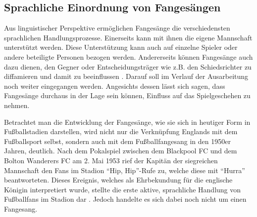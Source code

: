 \subsection{Sprachliche Einordnung von Fangesängen}
Aus linguistischer Perspektive ermöglichen Fangesänge die verschiedensten sprachlichen Handlungsprozesse.
Einerseits kann mit ihnen die eigene Mannschaft unterstützt werden.
Diese Unterstützung kann auch auf einzelne Spieler oder andere beteiligte Personen bezogen werden.
Andererseits können Fangesänge auch dazu dienen, den Gegner oder Entscheidungsträger wie z.B. den Schiedsrichter zu diffamieren und damit zu beeinflussen \cite[S. 167]{RK98}.
Darauf soll im Verlauf der Ausarbeitung noch weiter eingegangen werden.
Angesichts dessen lässt sich sagen, dass Fangesänge durchaus in der Lage sein können, Einfluss auf das Spielgeschehen zu nehmen.

Betrachtet man die Entwicklung der Fangesänge, wie sie sich in heutiger Form in Fußballstadien darstellen, wird nicht nur die Verknüpfung Englands mit dem Fußballsport selbst, sondern auch mit dem Fußballfangesang in den 1950er Jahren, deutlich.
Nach dem Pokalspiel zwischen dem Blackpool FC und dem Bolton Wanderers FC am 2. Mai 1953 rief der Kapitän der siegreichen Mannschaft den Fans im Stadion "`Hip, Hip"'-Rufe zu, welche diese mit "`Hurra"' beantworteten.
Dieses Ereignis, welches als Ehrbekundung für die englische Königin interpretiert wurde, stellte die erste aktive, sprachliche Handlung von Fußballfans im Stadion dar \cite[S. 65]{RK98}.
Jedoch handelte es sich dabei noch nicht um einen Fangesang.

